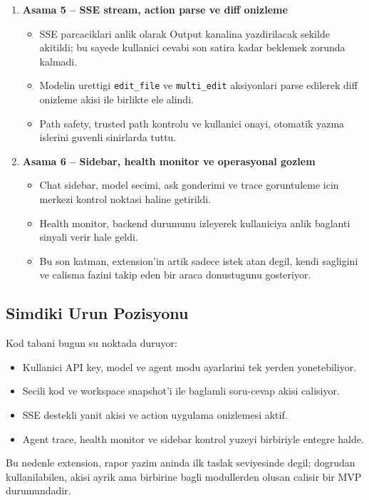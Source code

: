 \documentclass[11pt,a4paper]{article}
\begin{document}
\begin{enumerate}[leftmargin=1.5em]
\item \textbf{Asama 5 -- SSE stream, action parse ve diff onizleme}
\begin{itemize}[leftmargin=1.5em]
\item SSE parcaciklari anlik olarak Output kanalina yazdirilacak sekilde akitildi; bu sayede kullanici cevabi son satira kadar beklemek zorunda kalmadi.
\item Modelin urettigi \texttt{edit\_file} ve \texttt{multi\_edit} aksiyonlari parse edilerek diff onizleme akisi ile birlikte ele alindi.
\item Path safety, trusted path kontrolu ve kullanici onayi, otomatik yazma islerini guvenli sinirlarda tuttu.
\end{itemize}

\item \textbf{Asama 6 -- Sidebar, health monitor ve operasyonal gozlem}
\begin{itemize}[leftmargin=1.5em]
\item Chat sidebar, model secimi, ask gonderimi ve trace goruntuleme icin merkezi kontrol noktasi haline getirildi.
\item Health monitor, backend durumunu izleyerek kullaniciya anlik baglanti sinyali verir hale geldi.
\item Bu son katman, extension'in artik sadece istek atan degil, kendi sagligini ve calisma fazini takip eden bir araca donustugunu gosteriyor.
\end{itemize}
\end{enumerate}

\subsection{Simdiki Urun Pozisyonu}

Kod tabani bugun su noktada duruyor:
\begin{itemize}[leftmargin=1.5em]
\item Kullanici API key, model ve agent modu ayarlarini tek yerden yonetebiliyor.
\item Secili kod ve workspace snapshot'i ile baglamli soru-cevap akisi calisiyor.
\item SSE destekli yanit akisi ve action uygulama onizlemesi aktif.
\item Agent trace, health monitor ve sidebar kontrol yuzeyi birbiriyle entegre halde.
\end{itemize}

Bu nedenle extension, rapor yazim aninda ilk taslak seviyesinde degil; dogrudan kullanilabilen, akisi ayrik ama birbirine bagli modullerden olusan calisir bir MVP durumundadir.
\end{document}

